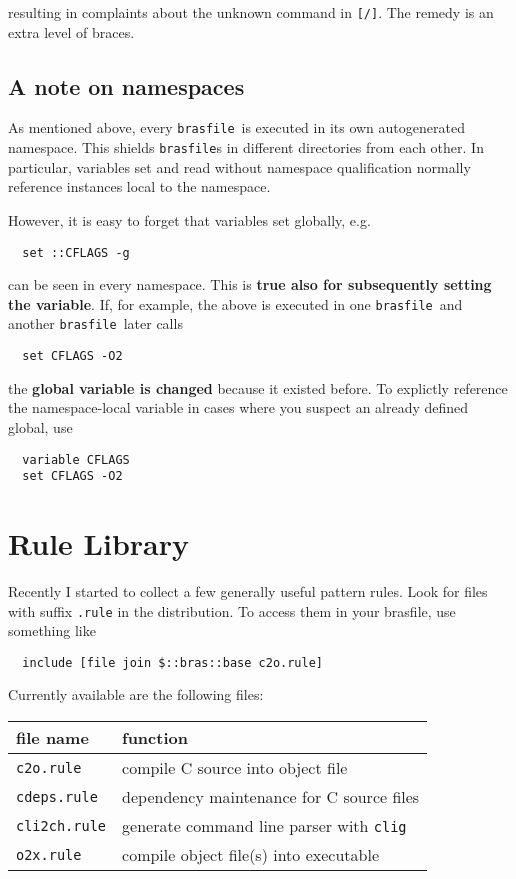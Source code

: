 \documentclass[11pt,bibtotoc,idxtotoc]{scrreprt}
\makeatletter
\newcommand{\brasfile}{\texttt{brasfile}}
\newcommand{\Indextt}[1]{\texttt{#1}\index{#1@\texttt{#1}}}
\makeatother
\begin{document}
resulting in complaints about the unknown command in
\texttt{[/]}. The remedy is an extra level of braces.


\subsection{A note on namespaces}
As mentioned above, every \brasfile\ is executed in its own
autogenerated namespace. This shields \brasfile{}s in different
directories from each other. In particular, variables set and
read without namespace qualification normally reference instances
local to the namespace. 

However, it is easy to forget that variables set globally,
e.g.
\begin{verbatim} 
  set ::CFLAGS -g
\end{verbatim}
can be seen in every namespace. This is \textbf{true also for
  subsequently setting the variable}. If, for example, the above is
executed in one \brasfile\ and another \brasfile\ later calls
\begin{verbatim} 
  set CFLAGS -O2
\end{verbatim}
the \textbf{global variable is changed} because it existed before. To
explictly reference the namespace-local variable in cases where you
suspect an already defined global, use
\begin{verbatim}
  variable CFLAGS
  set CFLAGS -O2
\end{verbatim}

\section{Rule Library}
Recently I started to collect a few generally useful pattern rules.
Look for files with suffix \Indextt{.rule} in the distribution. To
access them in your brasfile, use something like
\begin{verbatim}
  include [file join $::bras::base c2o.rule]
\end{verbatim}
Currently available are the following files:
\begin{center}
\begin{tabular}{l|l}
file name & function\\\hline
\texttt{c2o.rule} & compile C source into object file\\
\texttt{cdeps.rule} & dependency maintenance for C source files\\
\texttt{cli2ch.rule} & generate command line parser with
  \Indextt{clig}\cite{Kir00}\\
\texttt{o2x.rule} & compile object file(s) into executable\\
\end{tabular}
\end{center}
\end{document}
